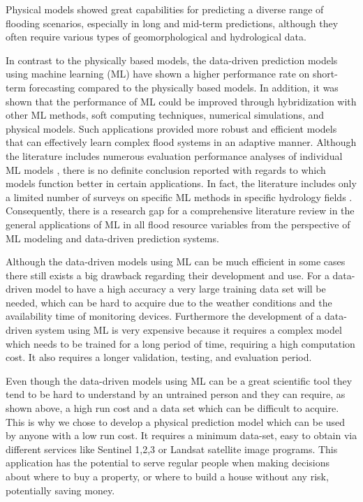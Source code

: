 \documentclass[12pt, a4paper]{report}
\begin{document}
Physical models showed great capabilities for predicting a diverse range of flooding scenarios\cite{Nayak}, especially in long and mid-term predictions, although they often require various types of geomorphological and  hydrological data. 
\par 

In contrast to the physically based models, the data-driven prediction models using machine learning (ML) have shown a higher performance rate on  short-term forecasting compared to the physically based models. In addition, it was shown that the performance of ML could be improved through hybridization with other ML methods, soft computing techniques, numerical simulations, and physical models. Such applications provided more robust and efficient models that can effectively learn complex flood systems in an adaptive manner. Although the literature includes numerous evaluation performance analyses of individual ML models \cite{Taherei, Kasiviswanathan, Ravansalar, Mosavi}, there is no definite conclusion reported with regards to which models function better in certain applications. In fact, the literature includes only a limited number of surveys on specific ML methods in specific hydrology fields \cite{Dandagala, Deka, Fotovatikhah}. Consequently, there is a research gap for a comprehensive literature review in the general applications of ML in all flood resource variables from the perspective of ML modeling and data-driven prediction systems.
\par 

Although the data-driven models using ML can be much efficient in some cases there still exists a big drawback regarding their development and use. For a data-driven model to have a high accuracy a very large training data set will be needed, which can be hard to acquire due to the weather conditions and the availability time of monitoring devices. Furthermore the development of a data-driven system using ML is very expensive because it requires a complex model which needs to be trained for a long period of time, requiring a high computation cost. It also requires a longer validation, testing, and evaluation period.
\par

Even though the data-driven models using ML can be a great scientific tool they tend to be hard to understand by an untrained person and they can require, as shown above, a high run cost and a data set which can be difficult to acquire. This is why we chose to develop a physical prediction model which can be used by anyone with a low run cost. It requires a minimum data-set, easy to obtain via different services like Sentinel 1,2,3 or Landsat satellite image programs. This application has the potential to serve regular people when making decisions about where to buy a property, or where to build a house without any risk, potentially saving money.
\par
\end{document}
